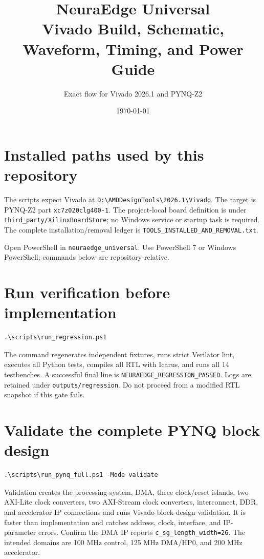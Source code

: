 \documentclass[10pt]{article}
\title{NeuraEdge Universal\\Vivado Build, Schematic, Waveform, Timing, and Power Guide}
\author{Exact flow for Vivado 2026.1 and PYNQ-Z2}
\date{\today}
\begin{document}
\maketitle
\tableofcontents
\clearpage

\section{Installed paths used by this repository}

The scripts expect Vivado at
\texttt{D:\textbackslash AMDDesignTools\textbackslash 2026.1\textbackslash Vivado}.
The target is PYNQ-Z2 part \texttt{xc7z020clg400-1}. The project-local board
definition is under \texttt{third\_party/XilinxBoardStore}; no Windows service
or startup task is required. The complete installation/removal ledger is
\texttt{TOOLS\_INSTALLED\_AND\_REMOVAL.txt}.

Open PowerShell in \texttt{neuraedge\_universal}. Use PowerShell 7 or Windows
PowerShell; commands below are repository-relative.

\section{Run verification before implementation}

\begin{lstlisting}
.\scripts\run_regression.ps1
\end{lstlisting}

The command regenerates independent fixtures, runs strict Verilator lint,
executes all Python tests, compiles all RTL with Icarus, and runs all 14
testbenches. A successful final line is
\texttt{NEURAEDGE\_REGRESSION\_PASSED}. Logs are retained under
\texttt{outputs/regression}. Do not proceed from a modified RTL snapshot if
this gate fails.

\section{Validate the complete PYNQ block design}

\begin{lstlisting}
.\scripts\run_pynq_full.ps1 -Mode validate
\end{lstlisting}

Validation creates the processing-system, DMA, three clock/reset islands,
two AXI-Lite clock converters, two AXI-Stream clock converters, interconnect,
DDR, and accelerator IP connections and runs Vivado block-design validation.
It is faster than implementation and catches address, clock, interface, and
IP-parameter errors. Confirm the DMA IP reports
\texttt{c\_sg\_length\_width=26}. The intended domains are 100 MHz control,
125 MHz DMA/HP0, and 200 MHz accelerator.
\end{document}
